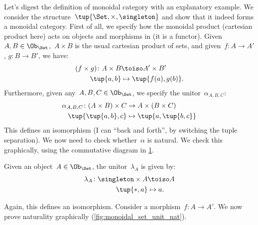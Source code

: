 \begin{example}
Let's digest the definition of monoidal category with an explanatory example. We consider the structure~$\tup{\Set,\times,\singleton}$ and show that it indeed forms a monoidal category. First of all, we specify how the monoidal product (cartesian product here) acts on objects and morphisms in \Set (it is a functor). Given~$A,B\in \Ob_{\Set}$,~$A\times B$ is the usual cartesian product of sets, and given~$f\colon A\to A'$, $g\colon B\to B'$, we have:
\begin{equation*}
    \begin{aligned}
    (f\times g)\colon A\times B&\toiso A'\times B'\\
    \tup{a,b}&\mapsto \tup{f(a),g(b)}.
    \end{aligned}
\end{equation*}
Furthermore, given any~$A,B,C\in \Ob_{\Set}$, we specify the unitor~$\alpha_{A,B,C}$:
\begin{equation*}
    \begin{aligned}
    \alpha_{A,B,C}\colon (A\times B)\times C&\to A\times (B\times C)\\
    \tup{\tup{a,b},c}&\mapsto \tup{a,\tup{b,c}}
    \end{aligned}
\end{equation*}
This defines an isomorphism (I can ``back and forth'', by switching the tuple separation). We now need to check whether~$\alpha$ is natural. We check this graphically, using the commutative diagram in \cref{fig:monoidal_set_ass_nat}.

\begin{figure}[h!]
\begin{center}
\end{center}
\caption{\label{fig:monoidal_set_ass_nat}}
\end{figure}

Given an object~$A\in \Ob_\Set$, the unitor~$\lambda_A$ is given by:
\begin{equation*}
    \begin{aligned}
    \lambda_A\colon \singleton \times A &\toiso A\\
    \tup{\ast,a}&\mapsto a.
    \end{aligned}
\end{equation*}

Again, this defines an isomorphism. Consider a morphism~$f\colon A\to A'$. We now prove naturality graphically (\cref{fig:monoidal_set_unit_nat}).


\end{example}
